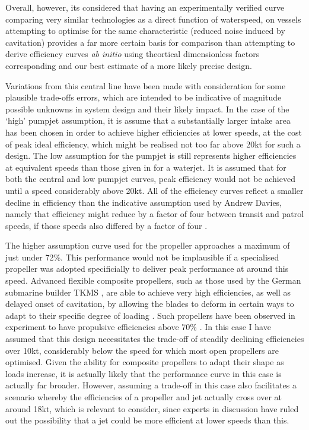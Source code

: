 \documentclass{article}\usepackage[]{graphicx}\usepackage[]{color}
\begin{document}
Overall, however, its considered that having an experimentally verified curve comparing very similar technologies as a direct function of waterspeed, on vessels attempting to optimise for the same characteristic (reduced noise induced by cavitation) provides a far more certain basis for comparison than attempting to derive efficiency curves \textit{ab initio} using theortical dimensionless factors corresponding and our best estimate of a more likely precise design.

Variations from this central line have been made with consideration for some plausible trade-offs errors, which are intended to be indicative of magnitude possible unknowns in system design and their likely impact.  In the case of the `high' pumpjet assumption, it is assume that a substantially larger intake area has been chosen in order to achieve higher efficiencies at lower speeds, at the cost of peak ideal efficiency, which might be realised not too far above 20kt for such a design.  The low assumption for the pumpjet is still represents higher efficiencies at equivalent speeds than those given in \cite{fujisawa1995} for a waterjet. It is assumed that for both the central and low pumpjet curves, peak efficiency would not be achieved until a speed considerably above 20kt.  All of the efficiency curves reflect a smaller decline in efficiency than the indicative assumption used by Andrew Davies, namely that efficiency might reduce by a factor of four between transit and patrol speeds, if those speeds also differed by a factor of four \cite{davies2017}.

The higher assumption curve used for the propeller approaches a maximum of just under 72\%.  This performance would not be implausible if a specialised propeller was adopted specificially to deliver peak performance at around this speed. Advanced flexible composite propellers, such as those used by the German submarine builder TKMS \parencite{durrant2016}, are able to achieve very high efficiencies, as well as delayed onset of cavitation, by allowing the blades to deform in certain ways to adapt to their specific degree of loading \parencite{young2007hydroelastic2}.  Such propellers have been observed in experiment to have propulsive efficiencies above 70\% \parencite{young2007hydroelastic}.  In this case I have assumed that this design necessitates the trade-off of steadily declining efficiencies over 10kt, considerably below the speed for which most open propellers are optimised.  Given the ability for composite propellers to adapt their shape as loads increase, it is actually likely that the performance curve in this case is actually far broader. However, assuming a trade-off in this case also facilitates a scenario whereby the efficiencies of a propeller and jet actually cross over at around 18kt, which is relevant to consider, since experts in discussion have ruled out the possibility that a jet could be more efficient at lower speeds than this.
\end{document}
